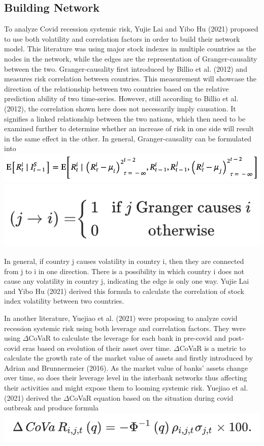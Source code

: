 \documentclass[a4paper,11pt]{article}
\begin{document}
\subsection{Building Network}
To analyze Covid recession systemic risk, Yujie Lai and Yibo Hu (2021) proposed to use both volatility and correlation factors in order to build their network model. This literature was using major stock indexes in multiple countries as the nodes in the network, while the edges are the representation of Granger-causality between the two. Granger-causality first introduced by Billio et al. (2012) and measures risk correlation between countries. This measurement will showcase the direction of the relationship between two countries based on the relative prediction ability of two time-series. However, still according to Billio et al. (2012), the correlation shown here does not necessarily imply causation. It signifies a linked relationship between the two nations, which then need to be examined further to determine whether an increase of risk in one side will result in the same effect in the other. In general, Granger-causality can be formulated into
\includegraphics{granger_causality_1.png}
\includegraphics{granger_causality_2.png}

In general, if country j causes volatility in country i, then they are connected from j to i in one direction. There is a possibility in which country i does not cause any volatility in country j, indicating the edge is only one way. Yujie Lai and Yibo Hu (2021) derived this formula to calculate the correlation of stock index volatility between two countries.

In another literature, Yuejiao et al. (2021) were proposing to analyze covid recession systemic risk using both leverage and correlation factors. They were using $\Delta$CoVaR to calculate the leverage for each bank in pre-covid and post-covid eras based on evolution of their asset over time. $\Delta$CoVaR is a metric to calculate the growth rate of the market value of assets and firstly introduced by Adrian and Brunnermeier (2016). As the market value of banks’ assets change over time, so does their leverage level in the interbank networks thus affecting their activities and might expose them to looming systemic risk. Yuejiao et al. (2021) derived the $\Delta$CoVaR equation based on the situation during covid outbreak and produce formula
\includegraphics{covar.png}
\end{document}
